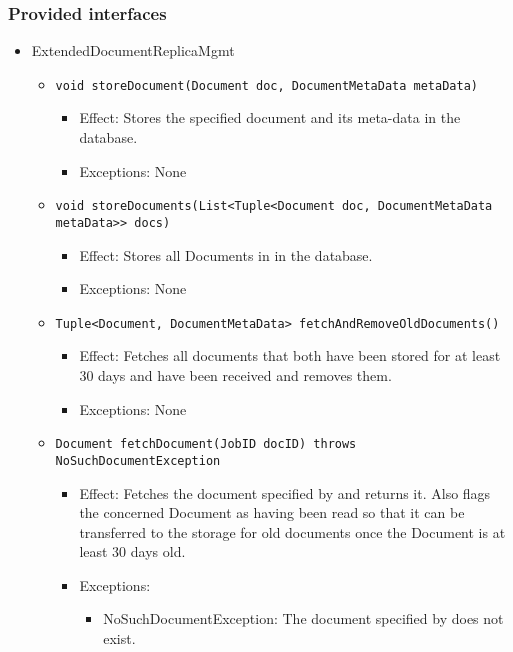 \subsubsection*{Provided interfaces}
\begin{itemize}
    \item ExtendedDocumentReplicaMgmt
	\begin{itemize}
		\item \texttt{void storeDocument(Document doc, DocumentMetaData metaData)}
		\begin{itemize}
			\item Effect: Stores the specified document and its meta-data in the database.
			\item Exceptions: None
		\end{itemize}

		\item \texttt{void storeDocuments(List<Tuple<Document doc, DocumentMetaData metaData>> docs)}
		\begin{itemize}
			\item Effect: Stores all Documents in  in the database.
			\item Exceptions: None
		\end{itemize}

		\item \texttt{Tuple<Document, DocumentMetaData> fetchAndRemoveOldDocuments()}
		\begin{itemize}
			\item Effect: Fetches all documents that both have been stored for at least 30 days and have been received and removes them.
			\item Exceptions: None
		\end{itemize}

		\item \texttt{Document fetchDocument(JobID docID) throws NoSuchDocumentException}
		\begin{itemize}
			\item Effect: Fetches the document specified by  and returns it. Also flags the concerned Document as having been read so that it can be transferred to the storage for old documents once the Document is at least 30 days old.
			\item Exceptions:
			\begin{itemize}
				\item NoSuchDocumentException: The document specified by  does not exist.
			\end{itemize}
		\end{itemize}
				

\end{itemize}
\end{itemize}
